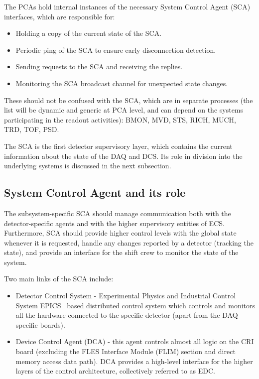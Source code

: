 The \glspl{PCA} hold internal instances of the necessary System Control Agent (\gls{SCA}) interfaces, which are responsible for:
\begin{itemize}
 \item Holding a copy of the current state of the \gls{SCA}.
 \item Periodic ping of the \gls{SCA} to ensure early disconnection detection.
 \item Sending requests to the \gls{SCA} and receiving the replies.
 \item Monitoring the \gls{SCA} broadcast channel for unexpected state changes.
\end{itemize}

These should not be confused with the \gls{SCA}, which are in separate processes (the list will be dynamic and generic at \gls{PCA} level, and can depend on the systems participating in the readout activities): \gls{BMON}, \gls{MVD}, \gls{STS}, \gls{RICH}, \gls{MUCH}, \gls{TRD}, \gls{TOF}, \gls{PSD}. 

The SCA is the first detector supervisory layer, which contains the current information about the state of the \gls{DAQ} and \gls{DCS}. Its role in division into the underlying systems is discussed in the next subsection.

\subsection{System Control Agent and its role}
The subsystem-specific \gls{SCA} should manage communication both with the detector-specific agents and with the higher supervisory entities of \gls{ECS}. Furthermore, \gls{SCA} should provide higher control levels with the global state whenever it is requested, handle any changes reported by a detector (tracking the state), and provide an interface for the shift crew to monitor the state of the system. 

Two main links of the \gls{SCA} include:
\begin{itemize}
    \item Detector Control System - Experimental Physics and Industrial Control System \gls{EPICS}~\cite{EPICS} based distributed control system which controls and monitors all the hardware connected to the specific detector (apart from the \gls{DAQ} specific boards).
    \item Device Control Agent (\gls{DCA}) - this agent controls almost all logic on the \gls{CRI} board (excluding the FLES Interface Module (\gls{FLIM}) section and direct memory access data path). \gls{DCA} provides a high-level interface for the higher layers of the control architecture, collectively referred to as \gls{EDC}. 
\end{itemize}










